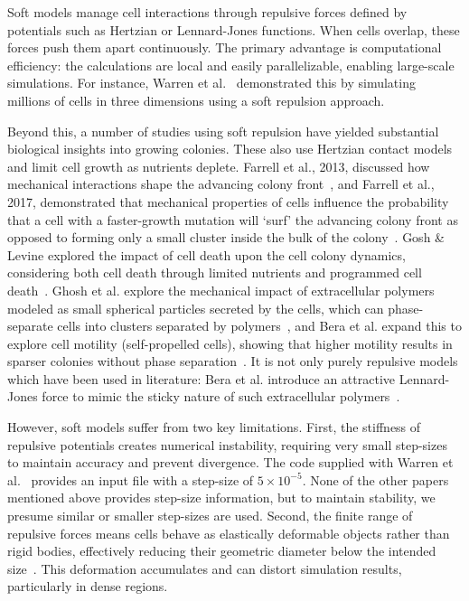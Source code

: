 \documentclass[a4paper,fleqn]{cas-dc}
\begin{document}
\begin{description}[style=nextline]
    \item[Soft (Potential-Based) Models]
        Soft models manage cell interactions through repulsive forces defined by potentials such as Hertzian or Lennard-Jones functions. When cells overlap, these forces push them apart continuously. The primary advantage is computational efficiency: the calculations are local and easily parallelizable, enabling large-scale simulations. For instance, Warren et al.~\cite{Warren2019} demonstrated this by simulating millions of cells in three dimensions using a soft repulsion approach. 
        
        Beyond this, a number of studies using soft repulsion have yielded substantial biological insights into growing colonies. These also use Hertzian contact models and limit cell growth as nutrients deplete. Farrell et al., 2013, discussed how mechanical interactions shape the advancing colony front~\cite{Farrell2013}, and Farrell et al., 2017, demonstrated that mechanical properties of cells influence the probability that a cell with a faster-growth mutation will `surf' the advancing colony front as opposed to forming only a small cluster inside the bulk of the colony~\cite{Farrell2017}. Gosh \& Levine explored the impact of cell death upon the cell colony dynamics, considering both cell death through limited nutrients and programmed cell death~\cite{GhoshLevine2017}. Ghosh et al. explore the mechanical impact of extracellular polymers modeled as small spherical particles secreted by the cells, which can phase-separate cells into clusters separated by polymers~\cite{Ghosh2015}, and Bera et al. expand this to explore cell motility (self-propelled cells), showing that higher motility results in sparser colonies without phase separation~\cite{Bera2023b}. It is not only purely repulsive models which have been used in literature: Bera et al. introduce an attractive Lennard-Jones force to mimic the sticky nature of such extracellular polymers~\cite{Bera2023a}.

        However, soft models suffer from two key limitations. First, the stiffness of repulsive potentials creates numerical instability, requiring very small step-sizes to maintain accuracy and prevent divergence. The code supplied with Warren et al.~\cite{Warren2019} provides an input file with a step-size of $5 \times 10^{-5}$. None of the other papers mentioned above provides step-size information, but to maintain stability, we presume similar or smaller step-sizes are used. Second, the finite range of repulsive forces means cells behave as elastically deformable objects rather than rigid bodies, effectively reducing their geometric diameter below the intended size~\cite{Yan2019}. This deformation accumulates and can distort simulation results, particularly in dense regions.


\end{description}
\end{document}
